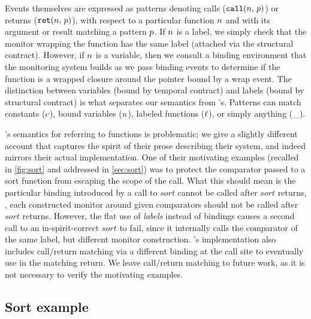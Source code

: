 \documentclass[preprint,onecolumn,9pt]{sigplanconf} %
\begin{document}
Events themselves are expressed as patterns denoting calls (${\tt call}(n,\, p)$) or returns (${\tt ret}(n,\, p)$), with respect to a particular function $n$ and with its argument or result matching a pattern $p$.
%
If $n$ is a label, we simply check that the monitor wrapping the function has the same label (attached via the structural contract).
%
However, if $n$ is a variable, then we consult a binding environment that the monitoring system builds as we pass binding events to determine if the function is a wrapped closure around the pointer bound by a wrap event.
%
The distinction between variables (bound by temporal contract) and labels (bound by structural contract) is what separates our semantics from \citeauthor{ianjohnson:dfm:icfp2011}'s.
%
Patterns can match constants ($c$), bound variables ($n$), labeled functions ($\ell$), or simply anything ($\_$).

\citeauthor{ianjohnson:dfm:icfp2011}'s semantics for referring to functions is problematic; we give a slightly different account that captures the spirit of their prose describing their system, and indeed mirrors their actual implementation.
%
One of their motivating examples (recalled in \autoref{fig:sort} and addressed in \autoref{sec:sort}) was to protect the comparator passed to a sort function from escaping the scope of the call.
%
What this should mean is the particular binding introduced by a call to $sort$ cannot be called after $sort$ returns, \ie, each constructed monitor around given comparators should not be called after $sort$ returns.
%
However, the flat use of \emph{labels} instead of bindings causes a second call to an in-spirit-correct $sort$ to fail, since it internally calls the comparator of the same label, but different monitor construction.
%
\citeauthor{ianjohnson:dfm:icfp2011}'s implementation also includes call/return matching via a different binding at the call site to eventually use in the matching return.
%
We leave call/return matching to future work, as it is not necessary to verify the motivating examples.

\subsection{Sort example} \label{sec:sort}
\end{document}
